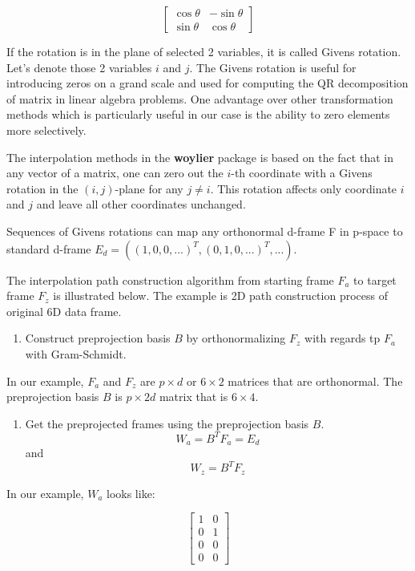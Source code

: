 \[ \begin{bmatrix}\cos \theta &-\sin \theta \\\sin \theta &\cos \theta \end{bmatrix} \]

If the rotation is in the plane of selected 2 variables, it is called Givens rotation. Let's denote those 2 variables \(i\) and \(j\). The Givens rotation is useful for introducing zeros on a grand scale and used for computing the QR decomposition of matrix in linear algebra problems. One advantage over other transformation methods which is particularly useful in our case is the ability to zero elements more selectively.

The interpolation methods in the \textbf{woylier} package is based on the fact that in any vector of a matrix, one can zero out the \(i\)-th coordinate with a Givens rotation in the \((i, j)\)-plane for any \(j\neq i\). This rotation affects only coordinate \(i\) and \(j\) and leave all other coordinates unchanged.

Sequences of Givens rotations can map any orthonormal d-frame F in p-space to standard d-frame \(E_d=((1, 0, 0, ...)^T, (0, 1, 0, ...)^T, ...)\).

The interpolation path construction algorithm from starting frame \(F_a\) to target frame \(F_z\) is illustrated below. The example is 2D path construction process of original 6D data frame.

\begin{enumerate}
\def\labelenumi{\arabic{enumi}.}
\tightlist
\item
  Construct preprojection basis \(B\) by orthonormalizing \(F_z\) with regards tp \(F_a\) with Gram-Schmidt.
\end{enumerate}

In our example, \(F_a\) and \(F_z\) are \(p\times d\) or \(6\times2\) matrices that are orthonormal. The preprojection basis \(B\) is \(p\times 2d\) matrix that is \(6\times 4\).

\begin{enumerate}
\def\labelenumi{\arabic{enumi}.}
\setcounter{enumi}{1}
\tightlist
\item
  Get the preprojected frames using the preprojection basis \(B\).
  \[W_a = B^TF_a = E_d\] and \[W_z = B^TF_z\]
\end{enumerate}

In our example, \(W_a\) looks like:

\[ \begin{bmatrix}1 & 0 \\0  &1 \\ 0&0 \\0&0\end{bmatrix} \]

